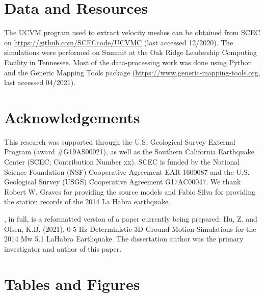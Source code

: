 

\section*{Data and Resources}
The UCVM program used to extract velocity meshes can be obtained from SCEC on \url{https://github.com/SCECcode/UCVMC} (last accessed 12/2020). The simulations were performed on Summit at the Oak Ridge Leadership Computing Facility in Tennessee. Most of the data-processing work was done using Python and the Generic Mapping Tools package (\url{https://www.generic-mapping-tools.org}, last accessed 04/2021).


\section*{Acknowledgements}

This research was supported through the U.S. Geological Survey External Program (award \#G19AS00021), as well as the Southern California Earthquake Center (SCEC; Contribution Number xx). SCEC is funded by the National Science Foundation (NSF) Cooperative Agreement EAR-1600087 and the U.S. Geological Survey (USGS) Cooperative Agreement G17AC00047. We thank Robert W. Graves for providing the source models and Fabio Silva for providing the station records of the 2014 La Habra earthquake.

, in full, is a reformatted version of a paper currently being prepared: Hu, Z. and Olsen, K.B. (2021), 0-5 Hz Deterministic 3D Ground Motion Simulations for the 2014 Mw 5.1 LaHabra Earthquake. The dissertation author was the primary investigator and author of this paper.

\newpage
\section*{Tables and Figures}
%




